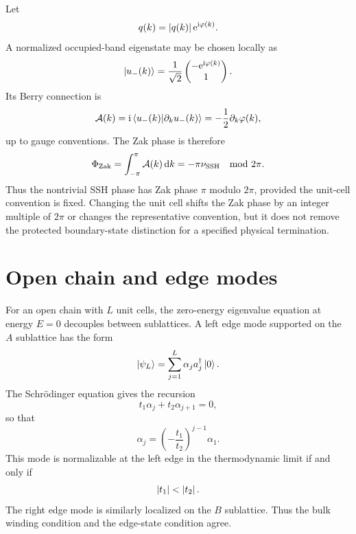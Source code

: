 Let
\begin{equation}
    q(k)=\left|q(k)\right|\mathrm{e}^{\mathrm{i}\varphi(k)}.
\end{equation}
A normalized occupied-band eigenstate may be chosen locally as
\begin{equation}
\label{eq:ssh-occupied-eigenstate}
    \left|u_-(k)\right\rangle
    =
    \frac{1}{\sqrt{2}}
    \begin{pmatrix}
        -\mathrm{e}^{\mathrm{i}\varphi(k)}\\ 1
    \end{pmatrix}.
\end{equation}
Its Berry connection is
\begin{equation}
\label{eq:ssh-berry-connection}
    \mathcal{A}(k)
    =
    \mathrm{i}\left\langle u_-(k)\middle|\partial_k u_-(k)\right\rangle
    =
    -\frac12\partial_k\varphi(k),
\end{equation}
up to gauge conventions.  The Zak phase is therefore
\begin{equation}
\label{eq:ssh-zak-phase}
    \Phi_{\rm Zak}
    =
    \int_{-\pi}^{\pi}\mathcal{A}(k)\,\mathrm{d} k
    =
    -\pi\nu_{\rm SSH}
    \quad
    \text{mod }2\pi.
\end{equation}
Thus the nontrivial SSH phase has Zak phase $\pi$ modulo $2\pi$, provided the
unit-cell convention is fixed.  Changing the unit cell shifts the Zak phase by an
integer multiple of $2\pi$ or changes the representative convention, but it does
not remove the protected boundary-state distinction for a specified physical
termination.

\section{Open chain and edge modes}
\label{sec:ssh-edge-modes}

For an open chain with $L$ unit cells, the zero-energy eigenvalue equation at
energy $E=0$ decouples between sublattices.  A left edge mode supported on the
$A$ sublattice has the form
\begin{equation}
\label{eq:ssh-left-edge-ansatz}
    \left|\psi_L\right\rangle
    =
    \sum_{j=1}^{L}\alpha_j a_j^\dagger\left|0\right\rangle.
\end{equation}
The Schrödinger equation gives the recursion
\begin{equation}
\label{eq:ssh-edge-recursion}
    t_1\alpha_j+t_2\alpha_{j+1}=0,
\end{equation}
so that
\begin{equation}
\label{eq:ssh-edge-wavefunction}
    \alpha_j
    =
    \left(-\frac{t_1}{t_2}\right)^{j-1}\alpha_1.
\end{equation}
This mode is normalizable at the left edge in the thermodynamic limit if and only
if
\begin{equation}
\label{eq:ssh-edge-normalizability}
    \left|t_1\right|<\left|t_2\right|.
\end{equation}
The right edge mode is similarly localized on the $B$ sublattice.  Thus the
bulk winding condition and the edge-state condition agree.

